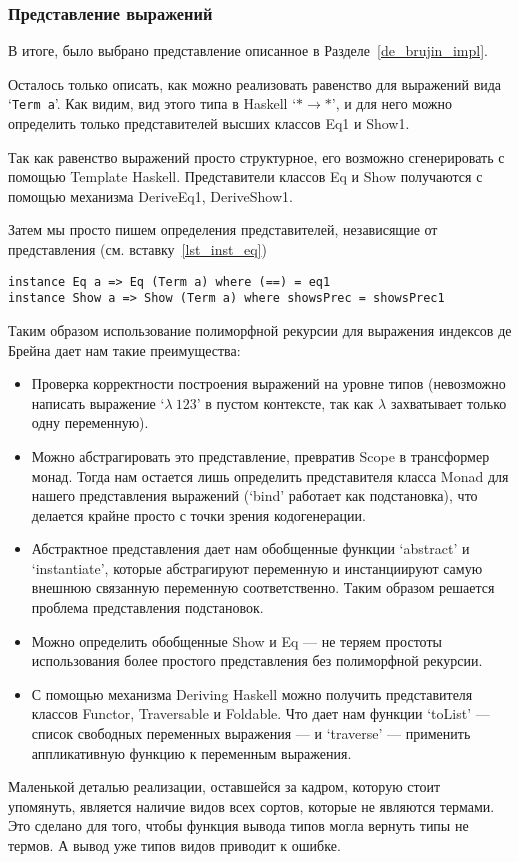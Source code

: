 \pagebreak
\subsubsection{Представление выражений}\label{final_repr}

В итоге, было выбрано представление описанное в Разделе~\ref{de_brujin_impl}.

Осталось только описать, как можно реализовать равенство для выражений вида `\lstinline{Term a}'. Как видим, вид этого типа в Haskell `$* \rightarrow *$', и для него можно определить только представителей высших классов\cite{prel_extras} Eq1 и Show1.

Так как равенство выражений просто структурное, его возможно сгенерировать с помощью Template Haskell\cite{TH}. Представители классов Eq и Show получаются с помощью механизма DeriveEq1, DeriveShow1\cite{deriveCompat}.

Затем мы просто пишем определения представителей, независящие от представления (см. вставку~\ref{lst_inst_eq})

\begin{lstlisting}[caption={Определение представителей классов Eq и Show для представления АСД}, captionpos=b, frame=single, float,floatplacement=H, label = {lst_inst_eq}]
instance Eq a => Eq (Term a) where (==) = eq1
instance Show a => Show (Term a) where showsPrec = showsPrec1
\end{lstlisting}

Таким образом использование полиморфной рекурсии для выражения индексов де Брейна дает нам такие преимущества:
\begin{itemize}
  \item Проверка корректности построения выражений на уровне типов (невозможно написать выражение `$\lambda\ 123$' в пустом контексте, так как $\lambda$ захватывает только одну переменную).
  \item Можно абстрагировать это представление, превратив Scope в трансформер монад. Тогда нам остается лишь определить представителя класса Monad для нашего представления выражений (`bind' работает как подстановка), что делается крайне просто с точки зрения кодогенерации.
  \item Абстрактное представления дает нам обобщенные функции `abstract' и `instantiate', которые абстрагируют переменную и инстанциируют самую внешнюю связанную переменную соответственно. Таким образом решается проблема представления подстановок.
  \item Можно определить обобщенные Show и Eq --- не теряем простоты использования более простого представления без полиморфной рекурсии.
  \item С помощью механизма Deriving Haskell можно получить представителя классов Functor, Traversable и Foldable. Что дает нам функции `toList' --- список свободных переменных выражения --- и `traverse' --- применить аппликативную функцию к переменным выражения.

\end{itemize}

\hfill

Маленькой деталью реализации, оставшейся за кадром, которую стоит упомянуть, является наличие видов всех сортов, которые не являются термами. Это сделано для того, чтобы функция вывода типов могла вернуть типы не термов. А вывод уже типов видов приводит к ошибке.
